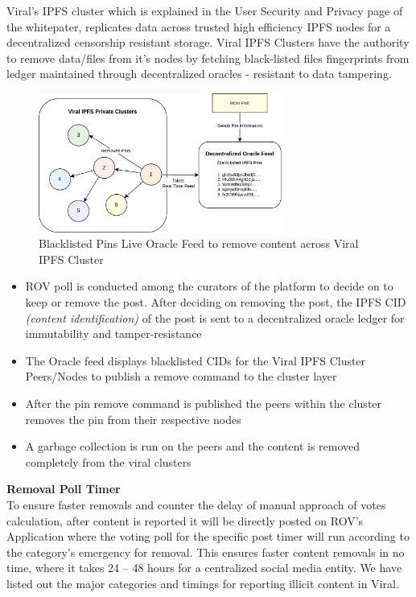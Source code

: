 \documentclass[conference]{IEEEtran}
\begin{document}
Viral's IPFS cluster which is explained in the User Security and Privacy page of the whitepater, replicates data across trusted high efficiency IPFS nodes for a decentralized censorship resistant storage. Viral IPFS Clusters have the authority to remove data/files from it's nodes by fetching black-listed files fingerprints from ledger maintained through decentralized oracles - resistant to data tampering.\\

\begin{figure}[H]
\begin{center}
\includegraphics[width=8cm]{content-removal}
\end{center}
\caption{Blacklisted Pins Live Oracle Feed to remove content across Viral IPFS Cluster}
\end{figure}

\begin{itemize}[wide, labelwidth=!, labelindent=0pt]
\item ROV poll is conducted among the curators of the platform to decide on to keep or remove the post.  After deciding on removing the post,  the IPFS CID \textit{(content identification)} of the post is sent to a decentralized oracle ledger for immutability and tamper-resistance
\item The Oracle feed displays blacklisted CIDs for the Viral IPFS Cluster Peers/Nodes to publish a remove command to the cluster layer
\item After the pin remove command is published the peers within the cluster removes the pin from their respective nodes
\item A garbage collection is run on the peers and the content is removed completely from the viral clusters
\end{itemize}



\textbf{Removal Poll Timer}\\

To ensure faster removals and counter the delay of manual approach of votes calculation, after content is reported it will be directly posted on ROV’s Application where the voting poll for the specific post timer will run according to the category’s emergency for removal. This ensures faster content removals in no time, where it takes 24 – 48 hours for a centralized social media entity. We have listed out the major categories and timings for reporting illicit content in Viral.
\end{document}
